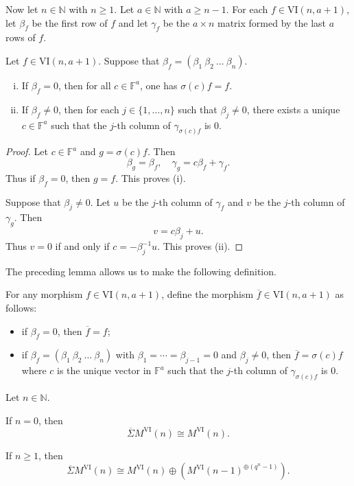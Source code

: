 \documentclass{amsart}
\numberwithin{equation}{section}
\newcommand{\N}{{\mathbb{N}}}
\newcommand{\F}{{\mathbb{F}}}
\newcommand{\VI}{{\mathrm{VI}}}
\newcommand{\SSigma}{{\overline{\Sigma}}}
\begin{document}
Now let $n\in\N$ with $n\geqslant 1$. Let $a\in \N$ with $a\geqslant n-1$. For each $f\in \VI(n,a+1)$, let $\beta_f$ be the first row of $f$ and let $\gamma_f$ be the $a\times n$ matrix formed by the last $a$ rows of $f$. 

\begin{lemma} \label{lem:reduced_form}
   Let $f\in \VI(n,a+1)$. Suppose that $\beta_f=(\beta_1 \ \beta_2 \ \ldots \ \beta_n)$.
   \begin{enumerate}[(i)]
      \item If $\beta_f=0$, then for all $c\in \F^a$, one has $\sigma(c)f=f$.  
      \item If $\beta_f\neq 0$, then for each $j\in\{1,\ldots,n\}$ such that $\beta_j\neq 0$, there exists a unique $c\in \F^a$ such that the $j$-th column of $\gamma_{\sigma(c)f}$ is $0$.
   \end{enumerate}
\end{lemma}

\begin{proof}
Let $c\in \F^a$ and $g=\sigma(c)f$. Then
\[ \beta_g = \beta_f, \quad \gamma_g = c\beta_f + \gamma_f. \]
Thus if $\beta_f=0$, then $g=f$. This proves (i).

Suppose that $\beta_j\neq 0$. Let $u$ be the $j$-th column of $\gamma_f$ and $v$ be the $j$-th column of $\gamma_g$. Then 
\[ v = c\beta_j + u. \] 
Thus $v=0$ if and only if $c=-\beta_j^{-1}u$. This proves (ii).
\end{proof}

The preceding lemma allows us to make the following definition.

\begin{definition} \label{def:reduced_form}
   For any morphism $f\in \VI(n,a+1)$, define the morphism $\overline{f}\in \VI(n,a+1)$ as follows:
   \begin{itemize}
      \item if $\beta_f=0$, then $\overline{f}=f$;
      \item if $\beta_f=(\beta_1 \ \beta_2 \ \ldots \ \beta_n)$ with $\beta_1=\cdots=\beta_{j-1}=0$ and $\beta_j\neq 0$, then $\overline{f}=\sigma(c)f$ where $c$ is the unique vector in $\F^a$ such that the $j$-th column of $\gamma_{\sigma(c)f}$ is $0$.
   \end{itemize}    
\end{definition}

\begin{proposition} \label{prop:barshift1}
   Let $n\in \N$. 
   
   If $n=0$, then 
   \[ \SSigma M^{\VI}(n) \cong M^{\VI}(n). \]    
   
   If $n\geqslant 1$, then 
   \[ \SSigma M^{\VI}(n) \cong M^{\VI}(n) \oplus \left( M^{\VI}(n-1)^{\oplus (q^n-1)} \right). \]
\end{proposition}
\end{document}
